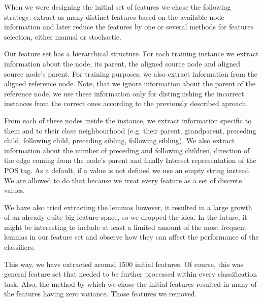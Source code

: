 When we were designing the initial set of features we chose the following
strategy: extract as many distinct features based on the available node information
and later reduce the features by one or several methods
for features selection, either manual or stochastic.

Our feature set has a hierarchical structure. For each training instance we extract
information about the node, its parent, the aligned source node and aligned source node's
parent. For training purposes, we also extract information from the aligned reference
node. Note, that we ignore information about the parent of the reference node, we
use these information only for distinguishing the incorrect instances from the correct ones
according to the previously described aproach.

From each of these  nodes inside the instance, we extract information
specific to them and to their close neighbourhood (e.g. their parent, grandparent,
preceding child, following child, preceding sibling, following sibling). We
also extract information about the number of preceding and following children,
direction of the edge coming from the node's parent and finally Interset representation
of the POS tag. As a default, if a value is not defined we use an empty string instead.
We are allowed to do that because we treat every feature as a set of discrete values.

We have also tried extracting the lemmas however, it resulted in a
large growth of an already quite big feature space, so we dropped the idea.
In the future, it might be interesting to include at least a limited amount of the most frequent lemmas in our
feature set and observe how they can affect the performance of the classifiers.

This way, we have extracted around 1500 initial features. Of course, this was general feature
set that needed to be further processed within every classification task. Also, the method
by which we chose the initial features resulted in many of the features having zero
variance. Those features we removed.


